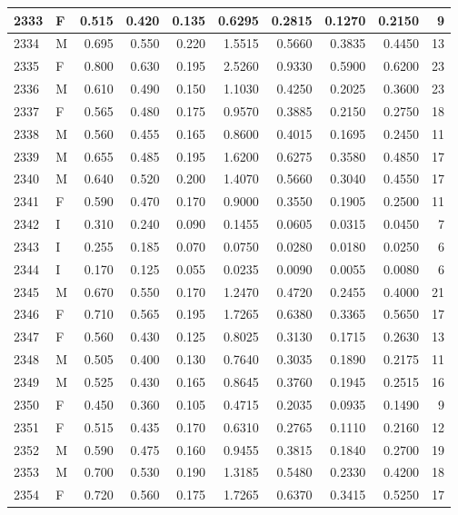 \documentclass[9pt,twocolumn,twoside,]{pnas-new}
\begin{document}
\begin{tabular}{l|l|r|r|r|r|r|r|r|r}
\hline
2333 & F & 0.515 & 0.420 & 0.135 & 0.6295 & 0.2815 & 0.1270 & 0.2150 & 9\\
\hline
2334 & M & 0.695 & 0.550 & 0.220 & 1.5515 & 0.5660 & 0.3835 & 0.4450 & 13\\
\hline
2335 & F & 0.800 & 0.630 & 0.195 & 2.5260 & 0.9330 & 0.5900 & 0.6200 & 23\\
\hline
2336 & M & 0.610 & 0.490 & 0.150 & 1.1030 & 0.4250 & 0.2025 & 0.3600 & 23\\
\hline
2337 & F & 0.565 & 0.480 & 0.175 & 0.9570 & 0.3885 & 0.2150 & 0.2750 & 18\\
\hline
2338 & M & 0.560 & 0.455 & 0.165 & 0.8600 & 0.4015 & 0.1695 & 0.2450 & 11\\
\hline
2339 & M & 0.655 & 0.485 & 0.195 & 1.6200 & 0.6275 & 0.3580 & 0.4850 & 17\\
\hline
2340 & M & 0.640 & 0.520 & 0.200 & 1.4070 & 0.5660 & 0.3040 & 0.4550 & 17\\
\hline
2341 & F & 0.590 & 0.470 & 0.170 & 0.9000 & 0.3550 & 0.1905 & 0.2500 & 11\\
\hline
2342 & I & 0.310 & 0.240 & 0.090 & 0.1455 & 0.0605 & 0.0315 & 0.0450 & 7\\
\hline
2343 & I & 0.255 & 0.185 & 0.070 & 0.0750 & 0.0280 & 0.0180 & 0.0250 & 6\\
\hline
2344 & I & 0.170 & 0.125 & 0.055 & 0.0235 & 0.0090 & 0.0055 & 0.0080 & 6\\
\hline
2345 & M & 0.670 & 0.550 & 0.170 & 1.2470 & 0.4720 & 0.2455 & 0.4000 & 21\\
\hline
2346 & F & 0.710 & 0.565 & 0.195 & 1.7265 & 0.6380 & 0.3365 & 0.5650 & 17\\
\hline
2347 & F & 0.560 & 0.430 & 0.125 & 0.8025 & 0.3130 & 0.1715 & 0.2630 & 13\\
\hline
2348 & M & 0.505 & 0.400 & 0.130 & 0.7640 & 0.3035 & 0.1890 & 0.2175 & 11\\
\hline
2349 & M & 0.525 & 0.430 & 0.165 & 0.8645 & 0.3760 & 0.1945 & 0.2515 & 16\\
\hline
2350 & F & 0.450 & 0.360 & 0.105 & 0.4715 & 0.2035 & 0.0935 & 0.1490 & 9\\
\hline
2351 & F & 0.515 & 0.435 & 0.170 & 0.6310 & 0.2765 & 0.1110 & 0.2160 & 12\\
\hline
2352 & M & 0.590 & 0.475 & 0.160 & 0.9455 & 0.3815 & 0.1840 & 0.2700 & 19\\
\hline
2353 & M & 0.700 & 0.530 & 0.190 & 1.3185 & 0.5480 & 0.2330 & 0.4200 & 18\\
\hline
2354 & F & 0.720 & 0.560 & 0.175 & 1.7265 & 0.6370 & 0.3415 & 0.5250 & 17\\

\end{tabular}
\end{document}
